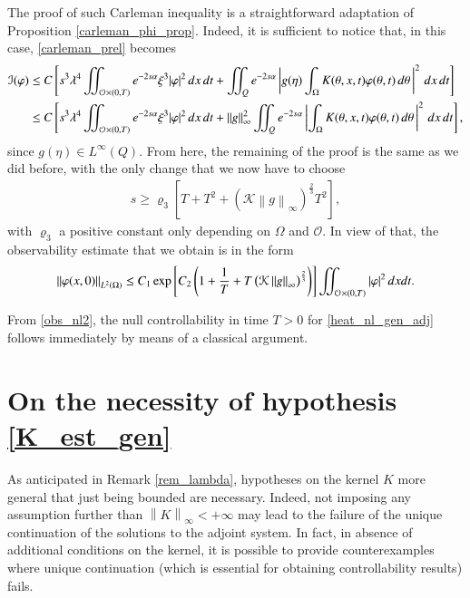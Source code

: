 \documentclass[preprint,1p]{elsarticle}
\newcommand{\norm}[2]{\left\|#1\right\|_{#2}}
\newcommand{\intd}{\displaystyle\int \kern -7pt \int}
\begin{document}
The proof of such Carleman inequality is a straightforward adaptation of Proposition \ref{carleman_phi_prop}. Indeed, it is sufficient to notice that, in this case, \eqref{carleman_prel} becomes
\begin{align*}
	\mathcal{I}(\varphi) &\leq C \left[s^3\lambda^4\intd_{\mathcal O\times(0,T)} e^{-2s\alpha}\xi^3 |\varphi|^2\,dx\,dt + \intd_Q e^{-2s\alpha}\left|g(\eta)\int_{\Omega} K(\theta,x,t)\varphi(\theta,t)\,d\theta\,\right|^2\,dx\,dt\right]
	\\
	&\leq C \left[s^3\lambda^4\intd_{\mathcal O\times(0,T)} e^{-2s\alpha}\xi^3 |\varphi|^2\,dx\,dt + \norm{g}{\infty}^2\intd_Q e^{-2s\alpha}\left|\int_{\Omega} K(\theta,x,t)\varphi(\theta,t)\,d\theta\,\right|^2\,dx\,dt\right],
\end{align*}
since $g(\eta)\in L^\infty(Q)$. From here, the remaining of the proof is the same as we did before, with the only change that we now have to choose 
\begin{align*}
	s\geq \varrho_3\left[T+T^2+\left(\mathcal K\norm{g}{\infty}\right)^{\frac 23}T^2\right],
\end{align*}
with $\varrho_3$ a positive constant only depending on $\Omega$ and $\mathcal O$. In view of that, the observability estimate that we obtain is in the form
\begin{align}\label{obs_nl2}
	\norm{\varphi(x,0)}{L^2(\Omega)}\leq C_1\exp\left[C_2\left(1 + \frac 1T + T\left(\mathcal K\norm{g}{\infty}\right)^{\frac 23}\right)\right] \intd_{\mathcal O\times(0,T)} |\varphi|^2\,dxdt.
\end{align}

From \eqref{obs_nl2}, the null controllability in time $T>0$ for \eqref{heat_nl_gen_adj} follows immediately by means of a classical argument.


	

\section{On the necessity of hypothesis \eqref{K_est_gen}}\label{comments_sec}

As anticipated in Remark \ref{rem_lambda}, hypotheses on the kernel $K$ more general that just being bounded are necessary. Indeed, not imposing any assumption further than $\norm{K}{\infty}<+\infty$ may lead to the failure of the unique continuation of the solutions to the adjoint system. In fact, in absence of additional conditions on the kernel, it is possible to provide counterexamples where unique continuation (which is essential for obtaining controllability results) fails.
\end{document}

